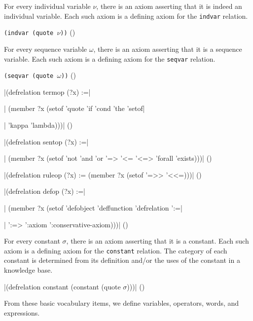 For every individual variable $\nu$, there is an axiom asserting that it is
indeed an individual variable.  Each such axiom is a defining axiom for the
{\tt indvar} relation.

\medskip
{\tt (indvar (quote $\nu$))}
\hfill(\equation)\par
\medskip

For every sequence variable $\omega$, there is an axiom asserting that it is a
sequence variable.  Each such axiom is a defining axiom for the {\tt seqvar}
relation.

\medskip
{\tt (seqvar (quote $\omega$))}
\hfill(\equation)\par
\medskip

\medskip
\verbatim|(defrelation termop (?x) :=|\par
\verbatim|  (member ?x (setof 'quote 'if 'cond 'the 'setof|\par
\verbatim|                    'kappa 'lambda)))|
\hfill(\equation)\par
\medskip

\medskip
\verbatim|(defrelation sentop (?x) :=|\par
\verbatim|  (member ?x (setof 'not 'and 'or '=> '<= '<=> 'forall 'exists)))|
\hfill(\equation)\par
\medskip

\medskip
\verbatim|(defrelation ruleop (?x) := (member ?x (setof  '=>> '<<=)))|
\hfill(\equation)\par
\medskip

\medskip
\verbatim|(defrelation defop (?x) :=|\par
\verbatim|  (member ?x (setof 'defobject 'deffunction 'defrelation ':=|\par
\verbatim|                    ':=> ':axiom ':conservative-axiom)))|
\hfill(\equation)\par
\medskip

For every constant $\sigma$, there is an axiom asserting that it is a
constant.  Each such axiom is a defining axiom for the {\tt constant}
relation.  The category of each constant is determined from its definition
and/or the uses of the constant in a knowledge base.

\medskip
\verbatim|(defrelation constant (constant (quote $\sigma$)))|
\hfill(\equation)\par
\medskip


From these basic vocabulary items, we define variables, operators, words,
and expressions.

